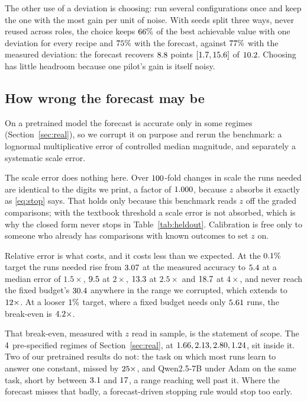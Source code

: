 The other use of a deviation is choosing: run several configurations once and keep the one with the
most gain per unit of noise. With seeds split three ways, never reused across roles, the choice
keeps $66\%$ of the best achievable value with one deviation for every recipe and
$75\%$ with the forecast, against $77\%$ with the measured deviation: the
forecast recovers $8.8$ points $[1.7, 15.6]$ of
$10.2$. Choosing has little headroom because one pilot's gain is itself noisy.

\subsection{How wrong the forecast may be}

On a pretrained model the forecast is accurate only in some regimes (Section~\ref{sec:real}), so we
corrupt it on purpose and rerun the benchmark: a lognormal multiplicative error of controlled
median magnitude, and separately a systematic scale error.

The scale error does nothing here. Over $100$-fold changes in scale the runs needed
are identical to the digits we print, a factor of $1.000$, because $z$ absorbs it
exactly as \eqref{eq:stop} says. That holds only because this benchmark reads $z$ off the graded
comparisons; with the textbook threshold a scale error is not absorbed, which is why the closed form
never stops in Table~\ref{tab:heldout}. Calibration is free only to someone who already has
comparisons with known outcomes to set $z$ on.

Relative error is what costs, and it costs less than we expected. At the $0.1\%$ target
the runs needed rise from $3.07$ at the measured accuracy to $5.4$ at a
median error of $1.5\times$, $9.5$ at $2\times$, $13.3$ at $2.5\times$
and $18.7$ at $4\times$, and never reach the fixed budget's $30.4$ anywhere
in the range we corrupted, which extends to $12\times$. At a looser
$1\%$ target, where a fixed budget needs only $5.61$ runs, the
break-even is $4.2\times$.

That break-even, measured with $z$ read in sample, is the statement of scope. The
$4$ pre-specified regimes of Section~\ref{sec:real}, at $1.66, 2.13, 2.80, 1.24$, sit inside
it. Two of our pretrained results do not: the task on which most runs learn to answer one
constant, missed by $25\times$, and Qwen2.5-7B under Adam on the same task,
short by between $3.1$ and $17$, a range reaching well
past it. Where the forecast
misses that badly, a forecast-driven stopping rule would stop too early.

